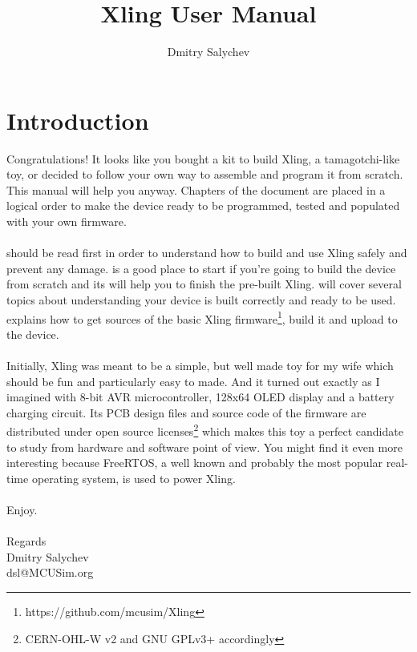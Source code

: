 \documentclass[11pt,a4paper,twoside]{report}
\title{Xling User Manual}
\author{Dmitry Salychev}
\begin{document}
\maketitle
\tableofcontents

\chapter*{Introduction}
Congratulations! It looks like you bought a kit to build Xling,
a tamagotchi-like toy, or decided to follow your own way to assemble and
program it from scratch. This manual will help you anyway. Chapters of the
document are placed in a logical order to make the device ready to be
programmed, tested and populated with your own firmware.
\\
\\
\textbf{} should be read first in order to understand how to
build and use Xling safely and prevent any damage.
\textbf{} is a good place to start if you're
going to build the device from scratch and its
\textbf{} will help you to finish the
pre-built Xling. \textbf{}
will cover several topics about understanding your device is built correctly
and ready to be used.
\textbf{} explains how to get sources of the basic
Xling firmware\footnote{https://github.com/mcusim/Xling}, build it and upload
to the device.
\\
\\
Initially, Xling was meant to be a simple, but well made toy for my wife which
should be fun and particularly easy to made. And it turned out exactly as I
imagined with 8-bit AVR microcontroller, 128x64 OLED display and a battery
charging circuit. Its PCB design files and source code of the firmware are
distributed under open source licenses\footnote{CERN-OHL-W v2 and GNU GPLv3+
accordingly} which makes this toy a perfect candidate to study from hardware
and software point of view. You might find it even more interesting because
FreeRTOS, a well known and probably the most popular real-time operating system,
is used to power Xling.
\\
\\
Enjoy.
\\
\\
Regards\\
Dmitry Salychev\\
dsl@MCUSim.org

\end{document}
